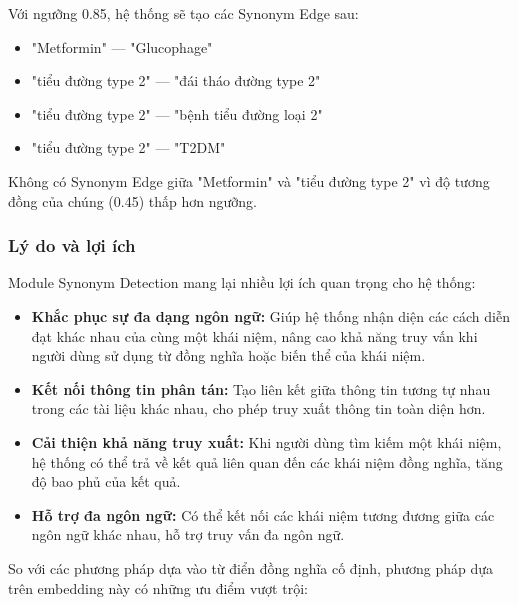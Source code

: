 Với ngưỡng 0.85, hệ thống sẽ tạo các Synonym Edge sau:
\begin{itemize}
    \item "Metformin" --- "Glucophage"
    \item "tiểu đường type 2" --- "đái tháo đường type 2"
    \item "tiểu đường type 2" --- "bệnh tiểu đường loại 2"
    \item "tiểu đường type 2" --- "T2DM"
\end{itemize}

Không có Synonym Edge giữa "Metformin" và "tiểu đường type 2" vì độ tương đồng của chúng (0.45) thấp hơn ngưỡng.

\subsubsection{Lý do và lợi ích}
Module Synonym Detection mang lại nhiều lợi ích quan trọng cho hệ thống:

\begin{itemize}
    \item \textbf{Khắc phục sự đa dạng ngôn ngữ:} Giúp hệ thống nhận diện các cách diễn đạt khác nhau của cùng một khái niệm, nâng cao khả năng truy vấn khi người dùng sử dụng từ đồng nghĩa hoặc biến thể của khái niệm.
    
    \item \textbf{Kết nối thông tin phân tán:} Tạo liên kết giữa thông tin tương tự nhau trong các tài liệu khác nhau, cho phép truy xuất thông tin toàn diện hơn.
    
    \item \textbf{Cải thiện khả năng truy xuất:} Khi người dùng tìm kiếm một khái niệm, hệ thống có thể trả về kết quả liên quan đến các khái niệm đồng nghĩa, tăng độ bao phủ của kết quả.
    
    \item \textbf{Hỗ trợ đa ngôn ngữ:} Có thể kết nối các khái niệm tương đương giữa các ngôn ngữ khác nhau, hỗ trợ truy vấn đa ngôn ngữ.
\end{itemize}

So với các phương pháp dựa vào từ điển đồng nghĩa cố định, phương pháp dựa trên embedding này có những ưu điểm vượt trội:

